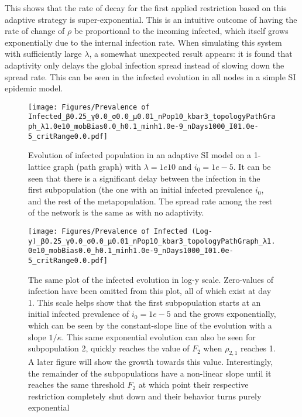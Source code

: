 This shows that the rate of decay for the first applied restriction based on this adaptive strategy is super-exponential. This is an intuitive outcome of having the rate of change of $\rho$ be proportional to the incoming infected, which itself grows exponentially due to the internal infection rate. When simulating this system with sufficiently large $\lambda$, a somewhat unexpected result appears: it is found that adaptivity only delays the global infection spread instead of slowing down the spread rate. This can be seen in the infected evolution in all nodes in a simple SI epidemic model.

\begin{figure}[!ht]
    \centering
    \texttt{[image: Figures/Prevalence of Infected\_β0.25\_γ0.0\_σ0.0\_μ0.01\_nPop10\_kbar3\_topologyPathGraph\_λ1.0e10\_mobBias0.0\_h0.1\_minh1.0e-9\_nDays1000\_I01.0e-5\_critRange0.0.pdf]}
    \caption{\small Evolution of infected population in an adaptive SI model on a 1-lattice graph 
    (path graph) with $\lambda = 1e10$ and $i_0 = 1e-5$. It can be seen that there is a significant 
    delay between the infection in the first subpopulation (the one with an initial infected prevalence $i_0$, and the rest of the metapopulation. The spread rate among the rest of the network is the same as with no adaptivity.}
\end{figure}

\begin{figure}[!ht]
    \centering
    \texttt{[image: Figures/Prevalence of Infected (Log-y)\_β0.25\_γ0.0\_σ0.0\_μ0.01\_nPop10\_kbar3\_topologyPathGraph\_λ1.0e10\_mobBias0.0\_h0.1\_minh1.0e-9\_nDays1000\_I01.0e-5\_critRange0.0.pdf]}
    \caption{\small The same plot of the infected evolution in log-y scale. 
    Zero-values of infection have been omitted from this plot, all of which exist at day 1. 
    This scale helps show that the first subpopulation starts at an initial infected prevalence of 
    $i_0=1e-5$ and the grows exponentially, which can be seen by the constant-slope line of the evolution with a slope $1/\kappa$. This same exponential evolution can also be seen for subpopulation 2, quickly reaches the value of $F_2$ when $\rho_{2,1}$ reaches 1. A later figure will show the growth towards this value. Interestingly, the remainder of the subpopulations have a non-linear slope until it reaches the same threshold $F_2$ at which point their respective restriction completely shut down and their behavior turns purely exponential}
\end{figure}

